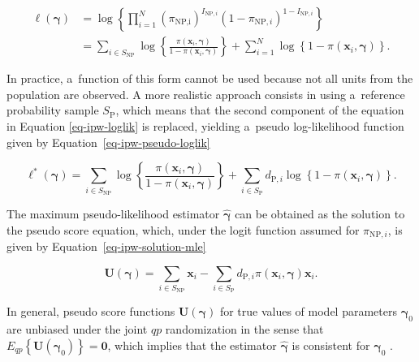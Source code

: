 \documentclass[nojss]{jss}
\begin{document}
\begin{equation}
\begin{aligned}
\ell(\boldsymbol{\gamma}) &= \log\left\{\prod_{i=1}^N \left(\pi_{\text{NP,i}}\right)^{I_{\text{NP},i}}\left(1-\pi_{\text{NP},i}\right)^{1-I_{\text{NP},i}}\right\} \\
&= \sum_{i \in S_{\text{NP}}} \log \left\{\frac{\pi\left(\boldsymbol{x}_i, \boldsymbol{\gamma}\right)}{1-\pi\left(\boldsymbol{x}_i, \boldsymbol{\gamma}\right)}\right\}+\sum_{i=1}^N \log \left\{1-\pi\left(\boldsymbol{x}_i, \boldsymbol{\gamma}\right)\right\}.
\end{aligned}
\label{eq-ipw-loglik}
\end{equation}

In practice, a~function of this form cannot be used because not all
units from the population are observed. A more realistic approach
consists in using a~reference probability sample \(S_{\text{P}}\), which
means that the second component of the equation in Equation
\ref{eq-ipw-loglik} is replaced, yielding a~pseudo log-likelihood
function given by Equation~\ref{eq-ipw-pseudo-loglik}

\begin{equation}
\ell^*(\boldsymbol{\gamma}) = \sum_{i \in S_{\text{NP}}} \log \left\{\frac{\pi\left(\boldsymbol{x}_i, \boldsymbol{\gamma}\right)}{1-\pi\left(\boldsymbol{x}_i, \boldsymbol{\gamma}\right)}\right\}+ \sum_{i \in S_{\text{P}}} d_{\text{P},i} \log \left\{1-\pi\left(\boldsymbol{x}_i, \boldsymbol{\gamma}\right)\right\}.
\label{eq-ipw-pseudo-loglik}
\end{equation}

The maximum pseudo-likelihood estimator \(\hat{\boldsymbol{\gamma}}\)
can be obtained as the solution to the pseudo score equation, which,
under the logit function assumed for \(\pi_{\text{NP},i}\), is given by
Equation~\ref{eq-ipw-solution-mle}

\begin{equation}
\boldsymbol{U}(\boldsymbol{\gamma}) = \sum_{i \in S_{\text{NP}}} \boldsymbol{x}_i - \sum_{i \in S_{\text{P}}} d_{\text{P},i} \pi(\boldsymbol{x}_i, \boldsymbol{\gamma}) \boldsymbol{x}_i.
\label{eq-ipw-solution-mle}
\end{equation}

In general, pseudo score functions
\(\boldsymbol{U}(\boldsymbol{\gamma})\) for true values of model
parameters \(\boldsymbol{\gamma}_0\) are unbiased under the joint
\(q p\) randomization in the sense that
\(E_{q p}\left\{\boldsymbol{U}\left(\boldsymbol{\gamma}_0\right)\right\}=\boldsymbol{0}\),
which implies that the estimator \(\hat{\boldsymbol{\gamma}}\) is
consistent for \(\boldsymbol{\gamma}_0\) \citep{wu2022statistical}.
\end{document}

